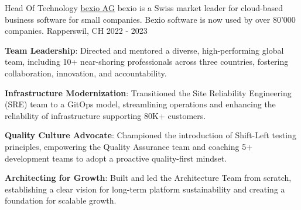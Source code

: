 \begin{cventries}
{  }
  \cventry
    {Head Of Technology} %
    {\href{https://www.bexio.com}{bexio AG}} %
    {bexio is a Swiss market leader for cloud-based business software for small companies. Bexio software is now used by over 80'000 companies.} %
    {Rapperswil, CH} %
    {2022 - 2023} %
    {
      \begin{cvitems} %
        \item {\textbf{Team Leadership}: Directed and mentored a diverse, high-performing global team, including 10+ near-shoring professionals across three countries, fostering collaboration, innovation, and accountability.}
        \item {\textbf{Infrastructure Modernization}: Transitioned the Site Reliability Engineering (SRE) team to a GitOps model, streamlining operations and enhancing the reliability of infrastructure supporting 80K+ customers.}
        \item {\textbf{Quality Culture Advocate}: Championed the introduction of Shift-Left testing principles, empowering the Quality Assurance team and coaching 5+ development teams to adopt a proactive quality-first mindset.}
        \item {\textbf{Architecting for Growth}: Built and led the Architecture Team from scratch, establishing a clear vision for long-term platform sustainability and creating a foundation for scalable growth.}
      \end{cvitems}
    }


\end{cventries}
